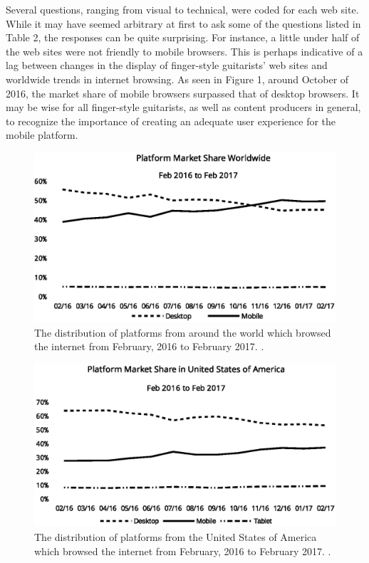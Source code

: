 \documentclass[unicode,hyperfootnotes=false,xetex,colorlinks=true,nofonts,nobib]{tufte-handout}
\begin{document}
Several questions, ranging from visual to technical, were coded for
each web site. While it may have seemed arbitrary at first to ask some
of the questions listed in Table 2, the responses can be quite
surprising. For instance, a little under half of the web sites were
not friendly to mobile browsers. This is perhaps indicative of a lag
between changes in the display of finger-style guitarists' web sites
and worldwide trends in internet browsing. As seen in Figure 1, around
October of 2016, the market share of mobile browsers surpassed that of
desktop browsers. It may be wise for all finger-style guitarists, as
well as content producers in general, to recognize the importance of
creating an adequate user experience for the mobile platform.
\begin{figure}
  \includegraphics[width=1.00\textwidth]{platformMarketShare.eps}
  \caption{The distribution of platforms from around the world which browsed the
    internet from February, 2016 to February 2017. .}
  \label{fig:StatCounter1}
\end{figure}
\begin{figure}
  \includegraphics[width=1.00\textwidth]{platformMarketShareUS.eps}
  \caption{The distribution of platforms from the United States of America which browsed the
    internet from February, 2016 to February 2017. .}
  \label{fig:StatCounter2}
\end{figure}
\end{document}
